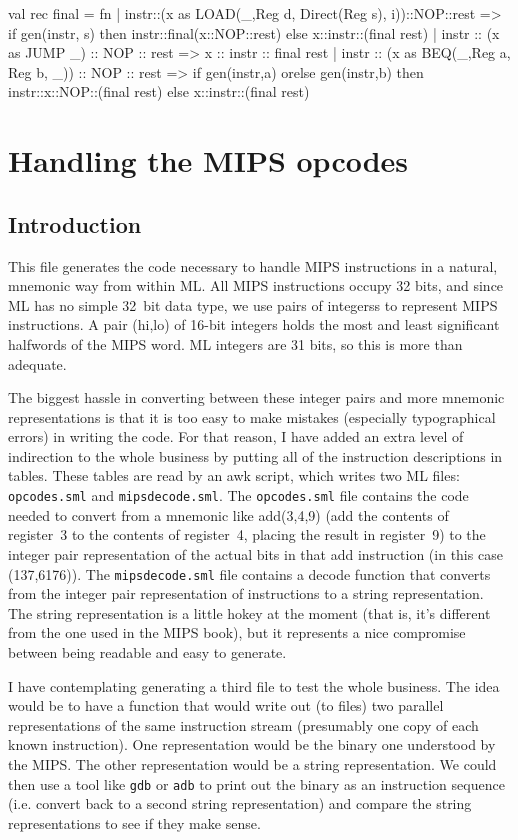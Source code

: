 val rec final =
 fn
  | instr::(x as LOAD(_,Reg d, Direct(Reg s), i))::NOP::rest =>
        if gen(instr, s) then instr::final(x::NOP::rest)
        else x::instr::(final rest)
  | instr :: (x as JUMP _) :: NOP :: rest =>
        x :: instr :: final rest
  | instr :: (x as BEQ(_,Reg a, Reg b, _)) :: NOP :: rest =>
        if gen(instr,a) orelse gen(instr,b) then instr::x::NOP::(final rest)
        else x::instr::(final rest)


\endcode
{}
\chapter{Handling the MIPS opcodes}
\section{Introduction}

This file generates the code necessary to handle MIPS instructions
in a natural, mnemonic way from within ML.
All MIPS instructions occupy 32 bits, and since ML has no simple
32~bit data type, we use pairs of integerss to represent MIPS instructions.
A pair \code{}(hi,lo)\edoc{} of 16-bit integers holds the most and least significant
halfwords of the MIPS word.
ML integers are 31 bits, so this is more than adequate.

The biggest hassle in converting between these integer pairs and more
mnemonic representations is that it is too easy to make mistakes
(especially typographical errors) in writing the code.
For that reason, I have added an extra level of indirection to the
whole business by putting all of the instruction descriptions in
tables.
These tables are read by an awk script, which writes two ML files:
{\tt opcodes.sml} and {\tt mipsdecode.sml}.
The {\tt opcodes.sml} file contains the code needed to convert from
a mnemonic like \code{}add(3,4,9)\edoc{} (add the contents of register~3 to
the contents of register~4, placing the result in register~9) to 
the integer pair representation of the actual bits in that add instruction
(in this case \code{}(137,6176)\edoc{}).
The {\tt mipsdecode.sml} file contains a \code{}decode\edoc{} function that converts
from the integer pair representation of instructions to a string
representation.
The string representation is a little hokey at the moment (that is,
it's different from the one used in the MIPS book), but it represents
a nice compromise between being readable and easy to generate.

I have contemplating generating a third file to test the whole
business.
The idea would be to have a function that would write out (to files)
two
parallel representations of the same instruction stream (presumably
one copy of each known instruction).
One representation would be the binary one understood by the MIPS.
The other representation would be a string representation.
We could then use a tool like {\tt gdb} or {\tt adb} to print out
the binary as an instruction sequence (i.e. convert back to
a second string representation) and compare the string representations
to see if they make sense.

